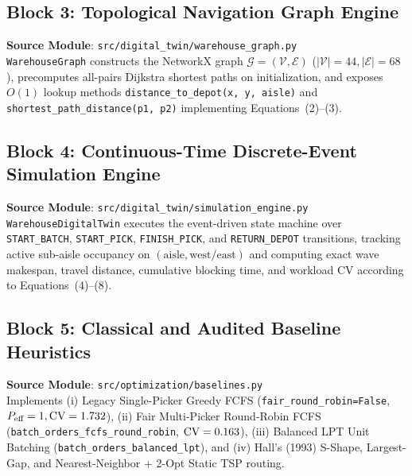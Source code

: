 \documentclass[11pt,a4paper]{article}
\begin{document}
\subsection{Block 3: Topological Navigation Graph Engine}
\noindent\textbf{Source Module}: \texttt{src/digital\_twin/warehouse\_graph.py}\\[0.5em]

\texttt{WarehouseGraph} constructs the NetworkX graph $\mathcal{G} = (\mathcal{V}, \mathcal{E})$ ($|\mathcal{V}| = 44, |\mathcal{E}| = 68$), precomputes all-pairs Dijkstra shortest paths on initialization, and exposes $O(1)$ lookup methods \texttt{distance\_to\_depot(x, y, aisle)} and \texttt{shortest\_path\_distance(p1, p2)} implementing Equations~(2)--(3).

\subsection{Block 4: Continuous-Time Discrete-Event Simulation Engine}
\noindent\textbf{Source Module}: \texttt{src/digital\_twin/simulation\_engine.py}\\[0.5em]

\texttt{WarehouseDigitalTwin} executes the event-driven state machine over \texttt{START\_BATCH}, \texttt{START\_PICK}, \texttt{FINISH\_PICK}, and \texttt{RETURN\_DEPOT} transitions, tracking active sub-aisle occupancy on $(\text{aisle}, \text{west/east})$ and computing exact wave makespan, travel distance, cumulative blocking time, and workload CV according to Equations~(4)--(8).

\subsection{Block 5: Classical and Audited Baseline Heuristics}
\noindent\textbf{Source Module}: \texttt{src/optimization/baselines.py}\\[0.5em]

Implements (i) Legacy Single-Picker Greedy FCFS (\texttt{fair\_round\_robin=False}, $P_{\text{eff}}=1, \text{CV}=1.732$), (ii) Fair Multi-Picker Round-Robin FCFS (\texttt{batch\_orders\_fcfs\_round\_robin}, $\text{CV}=0.163$), (iii) Balanced LPT Unit Batching (\texttt{batch\_orders\_balanced\_lpt}), and (iv) Hall's (1993) S-Shape, Largest-Gap, and Nearest-Neighbor + 2-Opt Static TSP routing.
\end{document}
